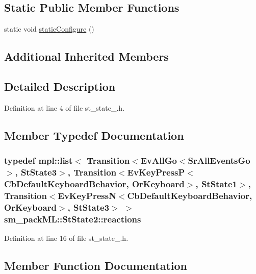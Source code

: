 \subsection*{Static Public Member Functions}
\begin{DoxyCompactItemize}
\item 
static void \hyperlink{structsm__packML_1_1StState2_abeb77404f08e67293a0641bb4bbf33a6}{static\+Configure} ()
\end{DoxyCompactItemize}
\subsection*{Additional Inherited Members}


\subsection{Detailed Description}


Definition at line 4 of file st\+\_\+state\+\_.\+h.



\subsection{Member Typedef Documentation}
\subsubsection[{\texorpdfstring{reactions}{reactions}}]{\setlength{\rightskip}{0pt plus 5cm}typedef mpl\+::list$<$ Transition$<$Ev\+All\+Go$<$Sr\+All\+Events\+Go$>$, {\bf St\+State3}$>$, Transition$<$Ev\+Key\+PressP$<$Cb\+Default\+Keyboard\+Behavior, {\bf Or\+Keyboard}$>$, {\bf St\+State1}$>$, Transition$<$Ev\+Key\+PressN$<$Cb\+Default\+Keyboard\+Behavior, {\bf Or\+Keyboard}$>$, {\bf St\+State3}$>$ $>$ {\bf sm\+\_\+pack\+M\+L\+::\+St\+State2\+::reactions}}\hypertarget{structsm__packML_1_1StState2_a4b5bf712482f1cb878d795c52171264e}{}\label{structsm__packML_1_1StState2_a4b5bf712482f1cb878d795c52171264e}


Definition at line 16 of file st\+\_\+state\+\_.\+h.



\subsection{Member Function Documentation}
